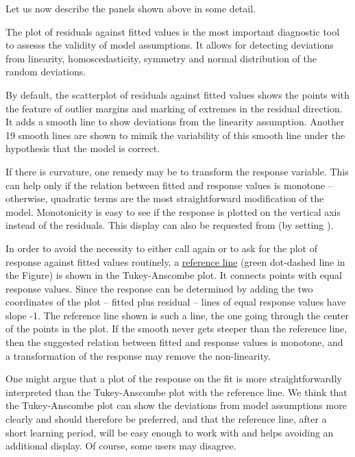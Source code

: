 \documentclass[11pt]{article}
\begin{document}

Let us now describe the panels shown above in some detail.

The plot of residuals against fitted values is the most important
diagnostic tool to assesss the validity of model assumptions.
It allows for detecting deviations from linearity, homoscedasticity,
symmetry and normal distribution of the random deviations.

By default, the scatterplot of residuals against fitted values shows
the points with the feature of outlier margins and marking of extremes in
the residual direction. It adds a smooth line to show deviations from
the linearity assumption. Another 19 smooth lines are shown to 
mimik the variability of this smooth line under the hypothesis that the
model is correct.

If there is curvature, one remedy may be to transform the response
variable. This can help only if the relation between fitted and
response values is monotone -- otherwise, quadratic terms are the
most straightforward modification of the model.
Monotonicity is easy to see if the response is plotted on the vertical
axis instead of the residuals.
This display can also be requested from 
(by setting ).

In order to avoid the necessity to either call  again or to 
ask for the plot of response against fitted values routinely,
a \ul{reference line} (green dot-dashed line in the Figure)
is shown in the Tukey-Anscombe plot.
It connects points with equal response values. Since the response can be
determined by adding the two coordinates of the plot -- 
fitted plus residual -- lines of equal response values have slope -1.
The reference line shown is such a line, the one going through the center
of the points in the plot.
If the smooth never gets steeper than the reference line, then the
suggested relation between fitted and response values is monotone, 
and a transformation of the response may remove the non-linearity.

One might argue that a plot of the response on the fit is more
straightforwardly interpreted than the Tukey-Anscombe plot with the
reference line. We think that the Tukey-Anscombe plot can show the
deviations from model assumptions more clearly and should therefore be
preferred, and that the reference line, after a short learning period, will
be easy enough to work with and helps avoiding an additional display. 
Of course, some users may disagree.
\end{document}
